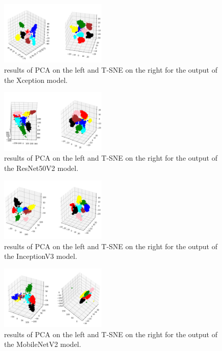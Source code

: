 \documentclass[conference]{IEEEtran}
\begin{document}
\begin{figure}
\centerline{\includegraphics[width=0.45\textwidth]{Xception_3d}}
\caption{results of PCA on the left and T-SNE on the right for the output of the Xception model.}
\label{Xception_3d}
\end{figure}
\begin{figure}[htbp]
\centerline{\includegraphics[width=0.45\textwidth]{ResNet_3d}}
\caption{results of PCA on the left and T-SNE on the right for the output of the ResNet50V2 model.}
\label{ResNet_3d}
\end{figure}
\begin{figure}[htbp]
\centerline{\includegraphics[width=0.45\textwidth]{Inception_3d}}
\caption{results of PCA on the left and T-SNE on the right for the output of the InceptionV3 model.}
\label{Inception_3d}
\end{figure}
\begin{figure}[htbp]
\centerline{\includegraphics[width=0.45\textwidth]{MobileNet_3d}}
\caption{results of PCA on the left and T-SNE on the right for the output of the MobileNetV2 model.}
\label{MobileNet_3d}
\end{figure}
\end{document}
